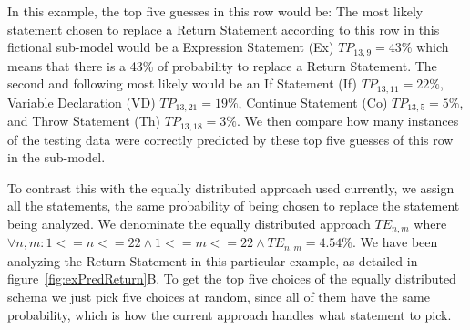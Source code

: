 \documentclass[conference]{IEEEtran}
\begin{document}
In this example, the top five guesses in this row would be: The most 
likely statement chosen to replace a Return Statement according to this row in 
this fictional sub-model would be a Expression Statement (Ex) $TP_{13,9} = 43\%$ 
which means that there is a 43\% of probability to replace a Return Statement. 
The second and following most likely would be an If Statement (If) $TP_{13,11} = 22\%$, Variable Declaration (VD)  $TP_{13,21} = 19\%$, 
Continue Statement (Co)  $TP_{13,5} = 5\%$, and Throw Statement (Th) $TP_{13,18} = 3\%$. We then compare how many instances of the testing data were correctly predicted 
by these top five guesses of this row in the sub-model. 


To contrast this with the equally distributed approach used currently, 
we assign all the statements, the same probability of being chosen to replace 
the statement being analyzed. We denominate the equally distributed approach 
$TE_{n,m}$ where $\forall n,m: 1<=n<=22 \land 1<=m<=22 \land TE_{n,m} = 4.54\%$. 
We have been analyzing the Return Statement in this particular example, as 
detailed in figure~\ref{fig:exPredReturn}B. To get the top five choices of the 
equally distributed schema we just pick five choices at random, since all of 
them have the same probability, which is how the current approach handles what 
statement to pick.

\end{document}
